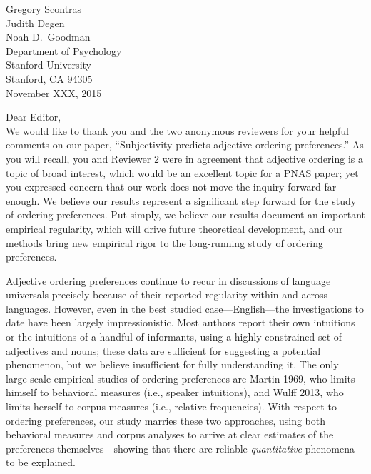 \documentclass[12pt]{article}
\begin{document}
{\flushright

\vspace{25pt}
Gregory Scontras\\
Judith Degen\\
Noah D.~Goodman\\
Department of Psychology\\
Stanford University\\
Stanford, CA 94305\\[20pt]

\noindent November XXX, 2015\\[20pt]}


\noindent Dear Editor,\\

\noindent We would like to thank you and the two anonymous reviewers for your helpful comments on our paper, ``Subjectivity predicts adjective ordering preferences.'' As you will recall, you and Reviewer 2 were in agreement that adjective ordering is a topic of broad interest, which would be an excellent topic for a PNAS paper; yet you expressed concern that our work does not move the inquiry forward far enough. We believe our results represent a significant step forward for the study of ordering preferences. Put simply, we believe our results document an important empirical regularity, which will drive future theoretical development, and our methods bring new empirical rigor to the long-running study of ordering preferences. 

Adjective ordering preferences continue to recur in discussions of language universals precisely because of their reported regularity within and across languages. However, even in the best studied case---English---the investigations to date have been largely impressionistic. Most authors report their own intuitions or the intuitions of a handful of informants, using a highly constrained set of adjectives and nouns; these data are sufficient for suggesting a potential phenomenon, but we believe insufficient for fully understanding it. The only large-scale empirical studies of ordering preferences are Martin 1969, who limits himself to behavioral measures (i.e., speaker intuitions), and Wulff 2013, who limits herself to corpus measures (i.e., relative frequencies). With respect to ordering preferences, our study marries these two approaches, using both behavioral measures and corpus analyses to arrive at clear estimates of the preferences themselves---showing that there are reliable \emph{quantitative} phenomena to be explained.
\end{document}
